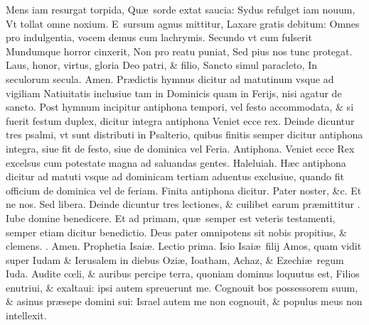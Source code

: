 \documentclass[a5paper,10pt]{book}
\makeatletter
\def\leftmarginnote{%
	\lrmarginnote{\hskip -\marginparsep \hskip -6.5em}}
\DeclareRobustCommand{\Vbar}{\vers@resp{-0.1em}{V}}
\DeclareRobustCommand{\Rbar}{\vers@resp{0pt}{R}}
\newcommand{\vers@resp@sym}{\raisebox{0.2ex}{\rotatebox[origin=c]{-20}{$\m@th\rceil$}}}
\newcommand{\vers@resp}[2]{%
  {\ooalign{\hidewidth\kern#1\vers@resp@sym\hidewidth\cr#2\cr}}%
}%
\def\ae{æ}
\def\oe{œ}
\makeatother
\begin{document}
\begin{multicols*}{2}
\newline \color{red} M\color{black}ens iam resurgat torpida, Qu\ae \ sorde extat saucia: Sydus refulget iam nouum, Vt tollat omne noxium.
\newline \color{red} E\color{black}\ sursum agnus mittitur, Laxare gratis debitum: Omnes pro indulgentia, vocem demus cum lachrymis.
\newline \color{red} S\color{black}ecundo vt cum fulserit Mundumque horror cinxerit, Non pro reatu puniat, Sed pius nos tunc protegat.
\newline \color{red} L\color{black}aus, honor, virtus, gloria Deo patri, \& filio, Sancto simul paracleto, In seculorum secula. Amen.
\newline {} \color{red} Pr\ae dictis hymnus dicitur ad matutinum vsque ad vigiliam Natiuitatis inclusiue tam in Dominicis quam in Ferijs, nisi agatur de sancto.
Post hymnum incipitur antiphona tempori, vel festo accommodata, \& si fuerit festum duplex, dicitur integra antiphona \color{black} Veniet ecce rex. \color{red}
Deinde dicuntur tres psalmi, vt sunt distributi in Psalterio, quibus finitis semper dicitur antiphona integra, siue fit de festo, siue de dominica vel Feria. Antiphona. \color{black}
Veniet ecce Rex excelsus cum potestate magna ad saluandas gentes. Haleluiah.
\color{red} H\ae c antiphona dicitur ad matuti vsque ad dominicam tertiam aduentus exclusiue, quando fit officium de dominica vel de feriam. %
Finita antiphona dicitur. \color{black} Pater noster, \&c. Et ne nos. Sed libera. \color{black}
\color{red} Deinde dicuntur tres lectiones, \& cuilibet earum pr\ae mittitur \Vbar . \color{black} Iube domine benedicere.
\color{red} Et ad primam, qu\ae \ semper est veteris testamenti, semper etiam dicitur benedictio. \color{black} Deus pater omnipotens sit nobis propitius, \& clemens. \color{red} \Rbar . \color{black} Amen.
\newline \color{red} Prophetia Isai\ae . \hfill Lectio prima. \color{black}
\vspace{-1em}
Isio\leftmarginnote{\begin{flushright}ca. 1.\end{flushright}} Isai\ae \ filij Amos, quam vidit super Iudam \& Ierusalem in diebus Ozi\ae , Ioatham, Achaz, \& Ezechi\ae \ regum Iuda. 
Audite c\oe li, \& auribus percipe terra, quoniam dominus loquutus est, Filios enutriui, \& exaltaui: ipsi autem spreuerunt me.
Cognouit bos possessorem suum, \& asinus pr\ae sepe domini sui: Israel autem me non cognouit, \& populus meus non intellexit.

\end{multicols*}
\end{document}
